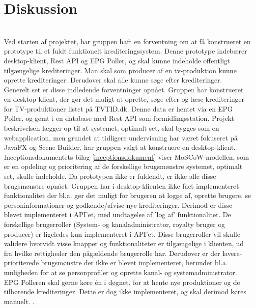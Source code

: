 \section{Diskussion}

\\
Ved starten af projektet, har gruppen haft en forventning om at få konstrueret en prototype til et fuldt funktionelt krediteringssystem. Denne prototype indebærer desktop-klient, Rest API og EPG Poller, og skal kunne indeholde offentligt tilgængelige krediteringer. Man skal som producer af en tv-produktion kunne oprette krediteringer. Derudover skal alle kunne søge efter krediteringer. \\
Generelt set er disse indledende forventninger opnået. Gruppen har konstrueret en desktop-klient, der gør det muligt at oprette, søge efter og læse krediteringer for TV-produktioner listet på TVTID.dk. Denne data er hentet via en EPG Poller, og gemt i en database med Rest API som formidlingsstation. Projekt beskrivelsen lægger op til at systemet, optimalt set, skal bygges som en webapplication, men grundet at tidligere undervisning har været fokuseret på JavaFX og Scene Builder, har gruppen valgt at konstruere en desktop-klient.\\
Inceptionsdokumentets bilag \ref{inceptionsdokument} viser MoSCoW-modellen, som er en opdeling og prioritering af de forskellige brugs\-møn\-stre systemet, optimalt set, skulle indeholde. Da prototypen ikke er fuldendt, er ikke alle disse brugsmønstre opnået.
Gruppen har i desktop-klienten ikke fået implementeret funktionalitet der bl.a. gør det muligt for brugeren at logge af, oprette brugere, se personinformationer og godkende/afvise nye krediteringer. Derimod er disse blevet implementeret i API'et, med undtagelse af 'log af' funktionalitet. De forskellige brugerroller (System- og kanaladministrator, royalty bruger og producer) er ligeledes kun implementeret i API'et. Disse brugerroller vil skulle validere hvorvidt visse knapper og funktionaliteter er tilgængelige i klienten, ud fra hvilke rettigheder den pågældende brugerrolle har.
Derudover er der lavere-prioriterede brugsmønstre der ikke er blevet implementeret, herunder bl.a. muligheden for at se personprofiler og oprette kanal- og systemadministrator.\\ 
EPG Polleren skal gerne køre én i døgnet, for at hente nye produktioner og de tilhørende krediteringer. Dette er dog ikke implementeret, og skal derimod køres manuelt. .\\

